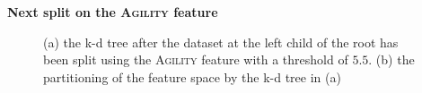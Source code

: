 \documentclass[xcolor={table}]{beamer}
\newcommand{\featN}[1]{\textsc{#1}}
\begin{document}
 \begin{frame} [plain]
 \begin{example}
 \begin{center}
\textbf{Next split on the \featN{Agility} feature}
\end{center}
\begin{figure}[htb]
	\begin{center}
	\end{center}
       \caption{(a) the k-d tree after the dataset at the left child of the root has been split using the \featN{Agility} feature with a threshold of $5.5$. (b) the partitioning of the feature space by the k-d tree in (a)}	
	\label{fig:kdtreeexam2}
\end{figure}
\end{example}
\end{frame} 
\end{document}
